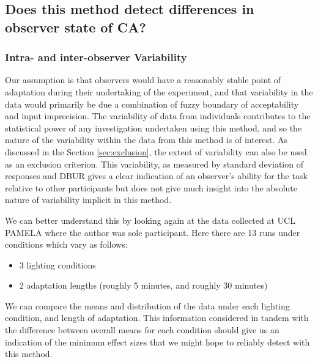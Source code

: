 
\subsection{Does this method detect differences in observer state of CA?}

\subsubsection{Intra- and inter-observer Variability}

Our assumption is that observers would have a reasonably stable point of adaptation during their undertaking of the experiment, and that variability in the data would primarily be due a combination of fuzzy boundary of acceptability and input imprecision. The variability of data from individuals contributes to the statistical power of any investigation undertaken using this method, and so the nature of the variability within the data from this method is of interest. As discussed in the Section \ref{sec:exclusion}, the extent of variability can also be used as an exclusion criterion. This variability, as measured by standard deviation of responses and \gls{DBUR} gives a clear indication of an observer's ability for the task relative to other participants but does not give much insight into the absolute nature of variability implicit in this method.

We can better understand this by looking again at the data collected at \gls{UCL} \gls{PAMELA} where the author was sole participant. Here there are 13 runs under conditions which vary as follows:

\begin{itemize}
    \item 3 lighting conditions
    \item 2 adaptation lengths (roughly 5 minutes, and roughly 30 minutes)
\end{itemize}
	
We can compare the means and distribution of the data under each lighting condition, and length of adaptation. This information considered in tandem with the difference between overall means for each condition should give us an indication of the minimum effect sizes that we might hope to reliably detect with this method.

